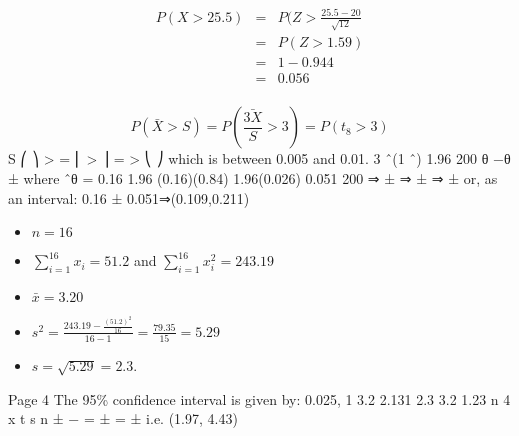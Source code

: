 \documentclass[a4paper,12pt]{article}
\begin{document}
\begin{eqnarray*}
P(X > 25.5) &=& P ( Z > \frac{25.5 − 20}{\sqrt{12}}\\
&=& P ( Z > 1.59) \\
&=& 1 − 0.944 \\
&=& 0.056\\
\end{eqnarray*}

\[ P(\bar{X} > S) = P( \frac{\bar{3X}}{S} > 3) = P(t_8 > 3)\] 
S
⎛ ⎞
> = ⎜ > ⎟ = >
⎝ ⎠
which is between 0.005 and 0.01.
3 ˆ(1 ˆ) 1.96
200
θ −θ
± where ˆθ = 0.16
1.96 (0.16)(0.84) 1.96(0.026) 0.051
200
⇒ ± ⇒ ± ⇒ ±
or, as an interval: 0.16 ± 0.051⇒(0.109,0.211)

\begin{itemize}

\item $n=16$

\item ${  \displaystyle  \sum^{16}_{i=1} x_i = 51.2 }$ and ${  \displaystyle  \sum^{16}_{i=1} x_i^2 = 243.19 }$

\item $\bar{x} =3.20 $

\item ${  \displaystyle s^2  = \frac{243.19 - \frac{(51.2)^2}{16}}{16-1}   = \frac{79.35}{15} = 5.29 }$

\item $ s = \sqrt{5.29} = 2.3$.

\end{itemize}
Page 4
The 95\% confidence interval is given by:
0.025, 1
3.2 2.131 2.3 3.2 1.23
n 4
x t s
n ± − = ± = ±
i.e. (1.97, 4.43)
\end{document}
